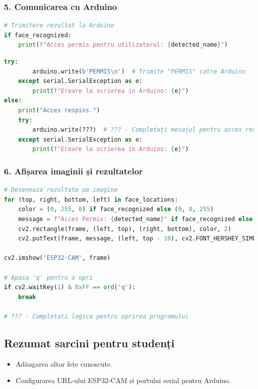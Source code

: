 \documentclass{report}
\begin{document}
\subsubsection{5. Comunicarea cu Arduino}
\begin{lstlisting}[language=Python]
# Trimitere rezultat la Arduino
if face_recognized:
    print(f"Acces permis pentru utilizatorul: {detected_name}")
\end{lstlisting}
\newpage
\vspace*{1cm}
\begin{lstlisting}[language=Python]
    try:
        arduino.write(b'PERMIS\n')  # Trimite "PERMIS" catre Arduino
    except serial.SerialException as e:
        print(f"Eroare la scrierea in Arduino: {e}")
else:
    print("Acces respins.")
    try:
        arduino.write(???)  # ??? - Completați mesajul pentru acces respins
    except serial.SerialException as e:
        print(f"Eroare la scrierea in Arduino: {e}")
\end{lstlisting}

\subsubsection{6. Afișarea imaginii și rezultatelor}
\begin{lstlisting}[language=Python]
# Deseneaza rezultate pe imagine
for (top, right, bottom, left) in face_locations:
    color = (0, 255, 0) if face_recognized else (0, 0, 255)
    message = f"Acces Permis: {detected_name}" if face_recognized else "Acces Respins"
    cv2.rectangle(frame, (left, top), (right, bottom), color, 2)
    cv2.putText(frame, message, (left, top - 10), cv2.FONT_HERSHEY_SIMPLEX, 0.6, color, 2)

cv2.imshow('ESP32-CAM', frame)

# Apasa 'q' pentru a opri
if cv2.waitKey(1) & 0xFF == ord('q'):
    break

# ??? - Completati logica pentru oprirea programului
\end{lstlisting}

\subsection{Rezumat sarcini pentru studenți}
\begin{itemize}
    \item Adăugarea altor fețe cunoscute.
    \item Configurarea URL-ului ESP32-CAM și portului serial pentru Arduino.
\end{itemize}
\end{document}

